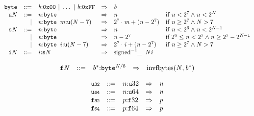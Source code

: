 \vspace{1ex}

\vspace{1ex}

$$
\begin{array}{@{}l@{}rrlll@{}l@{}}
& {\mathtt{byte}} &::=& {\mathit{b}}{:}\mathtt{0x00} ~|~ \dots ~|~ {\mathit{b}}{:}\mathtt{0xFF} &\Rightarrow& {\mathit{b}} \\
& {{\mathtt{u}}}{{\mathit{N}}} &::=& {\mathit{n}}{:}{\mathtt{byte}} &\Rightarrow& {\mathit{n}} &\quad
  \mbox{if}~{\mathit{n}} < {2^{7}} \land {\mathit{n}} < {2^{{\mathit{N}}}} \\ &&|&
{\mathit{n}}{:}{\mathtt{byte}}~\,{\mathit{m}}{:}{{\mathtt{u}}}{({\mathit{N}} - 7)} &\Rightarrow& {2^{7}} \cdot {\mathit{m}} + ({\mathit{n}} - {2^{7}}) &\quad
  \mbox{if}~{\mathit{n}} \geq {2^{7}} \land {\mathit{N}} > 7 \\
& {{\mathtt{s}}}{{\mathit{N}}} &::=& {\mathit{n}}{:}{\mathtt{byte}} &\Rightarrow& {\mathit{n}} &\quad
  \mbox{if}~{\mathit{n}} < {2^{6}} \land {\mathit{n}} < {2^{{\mathit{N}} - 1}} \\ &&|&
{\mathit{n}}{:}{\mathtt{byte}} &\Rightarrow& {\mathit{n}} - {2^{7}} &\quad
  \mbox{if}~{2^{6}} \leq {\mathit{n}} < {2^{7}} \land {\mathit{n}} \geq {2^{7}} - {2^{{\mathit{N}} - 1}} \\ &&|&
{\mathit{n}}{:}{\mathtt{byte}}~\,{\mathit{i}}{:}{{\mathtt{u}}}{({\mathit{N}} - 7)} &\Rightarrow& {2^{7}} \cdot {\mathit{i}} + ({\mathit{n}} - {2^{7}}) &\quad
  \mbox{if}~{\mathit{n}} \geq {2^{7}} \land {\mathit{N}} > 7 \\
& {{\mathtt{i}}}{{\mathit{N}}} &::=& {\mathit{i}}{:}{{\mathtt{s}}}{{\mathit{N}}} &\Rightarrow& {{{{\mathrm{signed}}^{{-1}}}}{\mathsf{\_}}~\,{\mathit{N}}}{{\mathit{i}}} \\
\end{array}
$$

\vspace{1ex}

$$
\begin{array}{@{}l@{}rrlll@{}l@{}}
& {{\mathtt{f}}}{{\mathit{N}}} &::=& {{\mathit{b}}^\ast}{:}{{\mathtt{byte}}^{{\mathit{N}} / 8}} &\Rightarrow& {\mathrm{invfbytes}}({\mathit{N}}, {{\mathit{b}}^\ast}) \\
\end{array}
$$

\vspace{1ex}

$$
\begin{array}{@{}l@{}rrlll@{}l@{}}
& {\mathtt{u{\scriptstyle32}}} &::=& {\mathit{n}}{:}{{\mathtt{u}}}{32} &\Rightarrow& {\mathit{n}} \\
& {\mathtt{u{\scriptstyle64}}} &::=& {\mathit{n}}{:}{{\mathtt{u}}}{64} &\Rightarrow& {\mathit{n}} \\
& {\mathtt{f{\scriptstyle32}}} &::=& {\mathit{p}}{:}{{\mathtt{f}}}{32} &\Rightarrow& {\mathit{p}} \\
& {\mathtt{f{\scriptstyle64}}} &::=& {\mathit{p}}{:}{{\mathtt{f}}}{64} &\Rightarrow& {\mathit{p}} \\
\end{array}
$$

